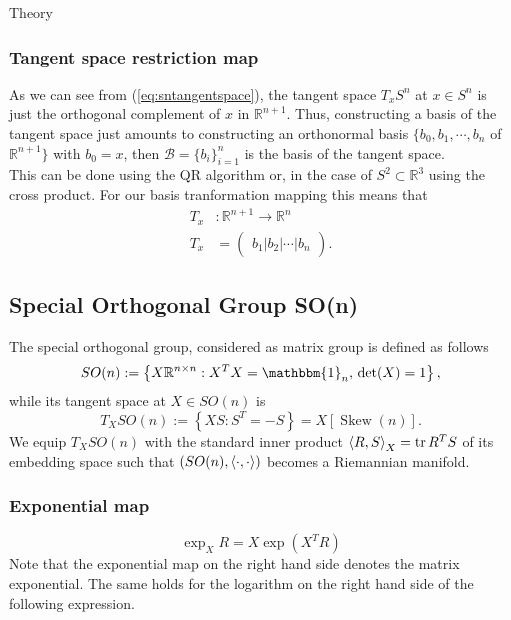 \begin{chapter}{Theory}
\subsubsection{Tangent space restriction map} %
\label{ssub:TangentS2}
As we can see from (\ref{eq:sntangentspace}), the tangent space $T_xS^n$ at $x\in S^n$ is just the orthogonal complement of $x$ in $\mathbb{R}^{n+1}$.
Thus, constructing a basis of the tangent space just amounts to constructing an orthonormal basis $\lbrace b_0,b_1,\cdots,b_n$ of $\mathbb{R}^{n+1}\rbrace$ with $b_0=x$, then
$\mathcal{B}=\lbrace b_i\rbrace_{i=1}^{n}$ is the basis of the tangent space.\\
This can be done using the QR algorithm or, in the case of $S^2\subset\mathbb{R}^3$ using the cross product. For our basis tranformation mapping this means that
\begin{align}
    T_x &: \mathbb{R}^{n+1}\to \mathbb{R}^{n}\\
    T_x &= \begin{pmatrix}
    b_1 | b_2 | \cdots | b_n
    \end{pmatrix}.
\end{align}

\subsection{Special Orthogonal Group SO(n)} %
\label{sub:SO(N)}
The special orthogonal group, considered as matrix group is defined as follows
\begin{equation}
    SO(n):=\left\lbrace X\mathbb{R}^{n\times n}: X^TX=\mathbbm{1}_n,\,\det(X)=1\right\rbrace,
\end{equation}
while its tangent space at $X\in SO(n)$ is
\begin{equation}
    \label{eq:son_tangent_space}
    T_XSO(n):=\left\lbrace XS: S^T=-S \right\rbrace = X[\operatorname{Skew}(n)].
\end{equation}
We equip $T_XSO(n)$ with the standard inner product $\left\langle R,S \right\rangle_X=\operatorname{tr} R^TS$ of its embedding space such that
$(SO(n),\left\langle \cdot,\cdot \right\rangle)$ becomes a Riemannian manifold.

\subsubsection{Exponential map} %
\label{ssub:ExponentialSO}
\begin{equation}
    \exp_X{R}=X\exp(X^TR)
\end{equation}
Note that the exponential map on the right hand side denotes the matrix exponential. The same holds for the logarithm on the right hand side of the following expression.


\end{chapter}
